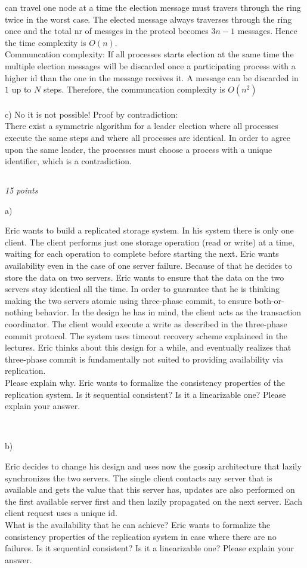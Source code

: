 \documentclass[a4paper]{article}
\newcommand{\points}[1]{\subsection{} \textit{#1 points}\\}
\newcommand{\question}[2][]{
  \noindent
  \parbox[t]{\textwidth}{#1 \parbox[t]{0.95\textwidth}{#2}}\\
}
\begin{document}
{  can travel one node at a time the election message must travers through the 
  ring twice in the worst case. The elected message always traverses through the 
  ring once and the total nr of messges in the protcol becomes $3n-1$ messages.
  Hence the time complexity is $O(n)$. \\
  Communcation complexity:
  If all processes starts election at the same time the multiple election messages
  will be discarded once a participating process with a higher id than the one in
  the message receives it. A message can be discarded in $1$ up to $N$ steps. 
  Therefore, the communcation complexity is $O(n^2)$\\\\
  c) No it is not possible! Proof by contradiction: \\
  There exist a symmetric algorithm for a leader election where all processes
  execute the same steps and where all processes are identical. In order 
  to agree upon the same leader, the processes must choose a process with a
  unique identifier, which is a contradiction.
%
}
\points{15}
\question[a)]{
  Eric wants to build a replicated storage system. In his
  system there is only one client. The client performs just one
  storage operation (read or write) at a time, waiting for each
  operation to complete before starting the next. Eric wants
  availability even in the case of one server failure. Because of that
  he decides to store the data on two servers. Eric wants to ensure
  that the data on the two servers stay identical all the time. In
  order to guarantee that he is thinking making the two servers atomic
  using three-phase commit, to ensure both-or-nothing behavior. In the
  design he has in mind, the client acts as the transaction
  coordinator. The client would execute a write as described in the
  three-phase commit protocol. The system uses timeout recovery scheme
  explaineed in the lectures. Eric thinks about this design for a
  while, and eventually realizes that three-phase commit is
  fundamentally not suited to providing availability via
  replication. \\
  Please explain why. Eric wants to formalize the consistency
  properties of the replication system. Is it sequential consistent?
  Is it a linearizable one? Please explain your answer.
}
\question[b)]{
  Eric decides to change his design and uses now the gossip
  architecture that lazily synchronizes the two servers. The single
  client contacts any server that is available and gets the value that
  this server has, updates are also performed on the first available
  server first and then lazily propagated on the next server. Each
  client request uses a unique id.\\
  What is the availability that he can achieve? Eric wants to
  formalize the consistency properties of the replication system in
  case where there are no failures. Is it sequential consistent? Is it
  a linearizable one? Please explain your answer.
}
\end{document}
